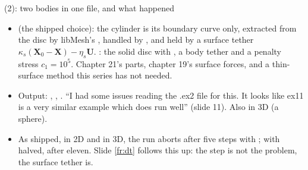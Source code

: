 \documentclass[aspectratio=169,11pt]{beamer}
\begin{document}
\begin{frame}{ (2): two bodies in one file, and what happened}
\label{fr:ex5b}
\footnotesize
\begin{itemize}
  \item {}  (the shipped choice): the cylinder is its boundary curve only, extracted from the disc by libMesh's , handled by , and held by a surface tether $\kappa_s(\mathbf{X}_0 - \mathbf{X}) - \eta_s\mathbf{U}$. : the solid disc with , a body tether and a penalty stress $c_1 = 10^5$. Chapter 21's parts, chapter 19's surface forces, and a thin-surface method this series has not needed.
  \item Output: , , . ``I had some issues reading the .ex2 file for this. It looks like ex11 is a very similar example which does run well'' (slide 11). Also in 3D (a sphere).
  \item {} As shipped, in 2D and in 3D, the run aborts after five steps with ; with  halved, after eleven. Slide \ref{fr:dt} follows this up: the step is not the problem, the surface tether is.
\end{itemize}
\end{frame}
\end{document}
